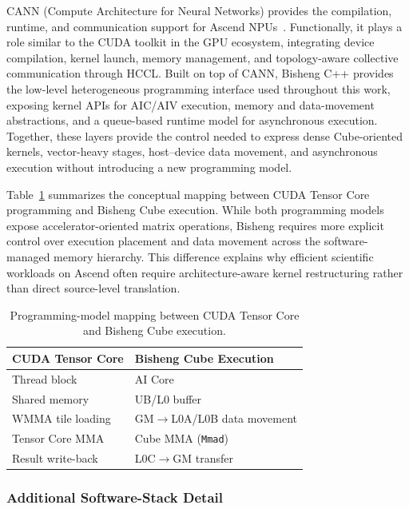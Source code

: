 \documentclass{article}
\newcommand{\rev}[1]{#1}
\begin{document}
CANN (Compute Architecture for Neural Networks) provides the compilation, runtime, and communication support for Ascend NPUs~\cite{liang2020ascend}. Functionally, it plays a role similar to the CUDA toolkit in the GPU ecosystem, integrating device compilation, kernel launch, memory management, and topology-aware collective communication through HCCL. Built on top of CANN, Bisheng C++ provides the low-level heterogeneous programming interface used throughout this work, exposing kernel APIs for AIC/AIV execution, memory and data-movement abstractions, and a queue-based runtime model for asynchronous execution. Together, these layers provide the control needed to express dense Cube-oriented kernels, vector-heavy stages, host--device data movement, and asynchronous execution without introducing a new programming model.

\rev{
Table~\ref{tab:cuda_bisheng_mapping} summarizes the conceptual mapping between
CUDA Tensor Core programming and Bisheng Cube execution. While both
programming models expose accelerator-oriented matrix operations, Bisheng
requires more explicit control over execution placement and data movement
across the software-managed memory hierarchy. This difference explains why
efficient scientific workloads on Ascend often require architecture-aware
kernel restructuring rather than direct source-level translation.
}

\begin{table}[t]
\centering
\caption{\rev{Programming-model mapping between CUDA Tensor Core and Bisheng Cube execution.}}
\label{tab:cuda_bisheng_mapping}
\scriptsize
\begin{tabular}{l|l}
\hline
\textbf{CUDA Tensor Core} & \textbf{Bisheng Cube Execution}\\
\hline
Thread block & AI Core \\
Shared memory & UB/L0 buffer \\
WMMA tile loading & GM$\rightarrow$L0A/L0B data movement \\
Tensor Core MMA & Cube MMA (\texttt{Mmad}) \\
Result write-back & L0C$\rightarrow$GM transfer \\
\hline
\end{tabular}
\end{table}


\subsubsection{Additional Software-Stack Detail}
\end{document}
